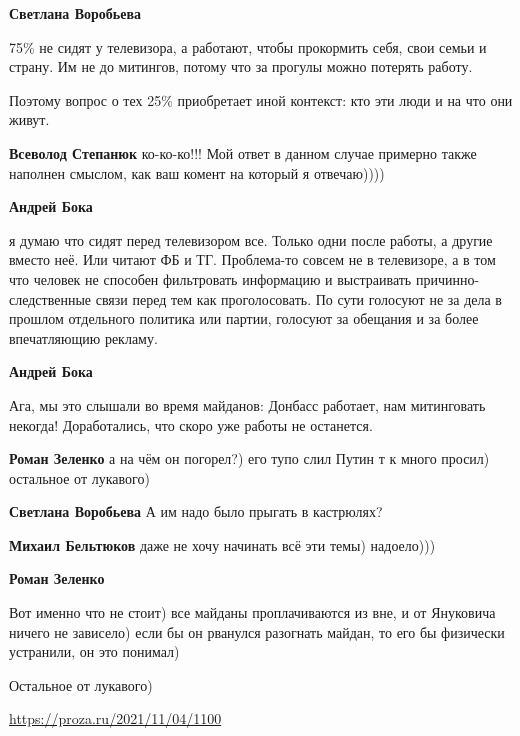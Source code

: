 \begin{itemize}
\begin{itemize}
\textbf{Светлана Воробьева} 

75\% не сидят у телевизора, а работают, чтобы прокормить себя, свои семьи и
страну. Им не до митингов, потому что за прогулы можно потерять работу.

Поэтому вопрос о тех 25\% приобретает иной контекст: кто эти люди и на что они
живут.

\textbf{Всеволод Степанюк} ко-ко-ко!!!
Мой ответ в данном случае примерно также наполнен смыслом, как ваш комент на который я отвечаю))))

\textbf{Андрей Бока} 

я думаю что сидят перед телевизором все. Только одни после работы, а другие
вместо неё. Или читают ФБ и ТГ. Проблема-то совсем не в телевизоре, а в том что
человек не способен фильтровать информацию и выстраивать причинно-следственные
связи перед тем как проголосовать. По сути голосуют не за дела в прошлом
отдельного политика или партии, голосуют за обещания и за более впечатляющию
рекламу.

\textbf{Андрей Бока} 

Ага, мы это слышали во время майданов: Донбасс работает, нам митинговать
некогда! Доработались, что скоро уже работы не останется.

\textbf{Роман Зеленко} а на чём он погорел?) его тупо слил Путин т к много просил) остальное от лукавого)

\textbf{Светлана Воробьева} А им надо было прыгать в кастрюлях?

\textbf{Михаил Бельтюков} даже не хочу начинать всё эти темы) надоело)))

\textbf{Роман Зеленко} 

Вот именно что не стоит) все майданы проплачиваются из вне, и от Януковича
ничего не зависело) если бы он рванулся разогнать майдан, то его бы физически
устранили, он это понимал)

Остальное от лукавого)
\end{itemize} %

\url{https://proza.ru/2021/11/04/1100}

\end{itemize} %
